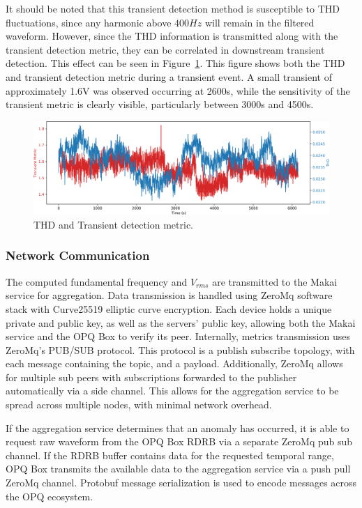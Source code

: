 It should be noted that this transient detection method is susceptible to THD fluctuations, since any harmonic above $400Hz$ will remain in the filtered waveform.
However, since the THD information is transmitted along with the transient detection metric, they can be correlated in downstream transient detection.
This effect can be seen in Figure~\ref{fig:opq:9}.
This figure shows both the THD and transient detection metric during a transient event.
A small transient of approximately 1.6V was observed occurring at 2600s, while the sensitivity of the transient metric is clearly visible, particularly between 3000s and 4500s.

\begin{figure}[ht]
	\begin{center}
		\includegraphics[width=1\textwidth]{images/opq-box/trans_thd_det.pdf}
	\end{center}
	\caption{THD and Transient detection metric.}
	\label{fig:opq:9}
\end{figure}

\subsubsection{Network Communication}\label{subsec:network-communication}

The computed fundamental frequency and $V_{rms}$ are transmitted to the Makai service for aggregation.
Data transmission is handled using ZeroMq software stack with Curve25519 elliptic curve encryption.
Each device holds a unique private and public key, as well as the servers' public key, allowing both the Makai service and the OPQ Box to verify its peer.
Internally, metrics transmission uses ZeroMq's PUB/SUB protocol.
This protocol is a publish subscribe topology, with each message containing the topic, and a payload.
Additionally, ZeroMq allows for multiple sub peers with subscriptions forwarded to the publisher automatically via a side channel.
This allows for the aggregation service to be spread across multiple nodes, with minimal network overhead.

If the aggregation service determines that an anomaly has occurred, it is able to request raw waveform from the OPQ Box RDRB via a separate ZeroMq pub sub channel.
If the RDRB buffer contains data for the requested temporal range, OPQ Box transmits the available data to the aggregation service via a push pull ZeroMq channel.
Protobuf message serialization is used to encode messages across the OPQ ecosystem.

